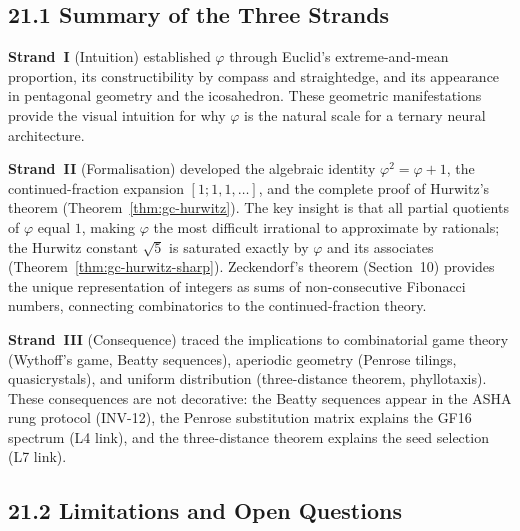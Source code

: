 \subsection{21.1 Summary of the Three Strands}
\label{subsec:gc-discussion-strands}

\textbf{Strand~I} (Intuition) established $\varphi$
through Euclid's extreme-and-mean proportion,
its constructibility by compass and straightedge, and
its appearance in pentagonal geometry and the
icosahedron.
These geometric manifestations provide the visual
intuition for why $\varphi$ is the natural scale for
a ternary neural architecture.

\textbf{Strand~II} (Formalisation) developed the
algebraic identity $\varphi^2 = \varphi + 1$,
the continued-fraction expansion $[1;1,1,\ldots]$,
and the complete proof of Hurwitz's theorem
(Theorem~\ref{thm:gc-hurwitz}).
The key insight is that all partial quotients of
$\varphi$ equal $1$, making $\varphi$ the
most difficult irrational to approximate by rationals;
the Hurwitz constant $\sqrt{5}$ is saturated exactly
by $\varphi$ and its associates (Theorem~\ref{thm:gc-hurwitz-sharp}).
Zeckendorf's theorem (Section~10) provides the
unique representation of integers as sums of
non-consecutive Fibonacci numbers, connecting
combinatorics to the continued-fraction theory.

\textbf{Strand~III} (Consequence) traced the
implications to combinatorial game theory
(Wythoff's game, Beatty sequences), aperiodic
geometry (Penrose tilings, quasicrystals), and
uniform distribution (three-distance theorem,
phyllotaxis).
These consequences are not decorative: the Beatty
sequences appear in the ASHA rung protocol
(INV-12), the Penrose substitution matrix explains
the GF16 spectrum (L4 link), and the three-distance
theorem explains the seed selection (L7 link).

\subsection{21.2 Limitations and Open Questions}
\label{subsec:gc-limitations}

